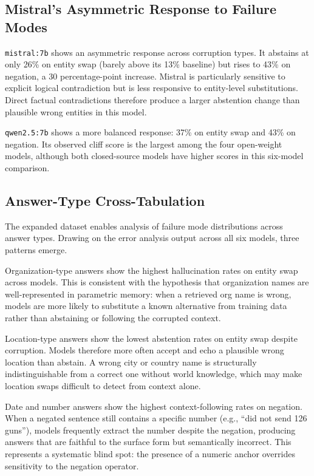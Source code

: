 \documentclass[11pt]{article}
\begin{document}
\subsection{Mistral's Asymmetric Response to Failure Modes}
\label{sec:mistral}

\texttt{mistral:7b} shows an asymmetric response across corruption types. It abstains at
only 26\% on entity swap (barely above its 13\% baseline) but rises to 43\% on negation,
a 30 percentage-point increase. Mistral is particularly sensitive to explicit logical
contradiction but is less responsive to entity-level substitutions. Direct factual
contradictions therefore produce a larger abstention change than plausible wrong entities
in this model.

\texttt{qwen2.5:7b} shows a more balanced response: 37\% on entity swap and 43\% on
negation. Its observed cliff score is the largest among the four open-weight models,
although both closed-source models have higher scores in this six-model comparison.

\subsection{Answer-Type Cross-Tabulation}
\label{sec:crosstab}

The expanded dataset enables analysis of failure mode distributions across answer types.
Drawing on the error analysis output across all six models, three patterns emerge.

Organization-type answers show the highest hallucination rates on entity swap across
models. This is consistent with the hypothesis that organization names are well-represented
in parametric memory: when a retrieved org name is wrong, models are more likely to
substitute a known alternative from training data rather than abstaining or following the
corrupted context.

Location-type answers show the lowest abstention rates on entity swap despite corruption.
Models therefore more often accept and echo a plausible wrong location than abstain. A
wrong city or country name is structurally indistinguishable from a correct one without
world knowledge, which may make location swaps difficult to detect from context alone.

Date and number answers show the highest context-following rates on negation. When a
negated sentence still contains a specific number (e.g., ``did not send 126 guns''), models
frequently extract the number despite the negation, producing answers that are faithful to
the surface form but semantically incorrect. This represents a systematic blind spot: the
presence of a numeric anchor overrides sensitivity to the negation operator.
\end{document}
